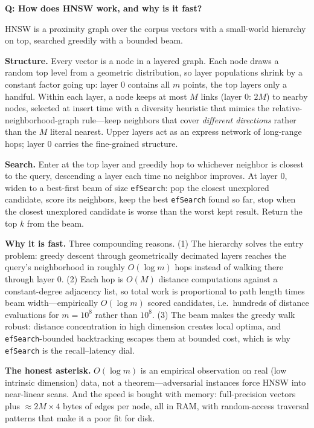 \begin{interviewq}
\textbf{Q: How does HNSW work, and why is it fast?}

 \quad {} \quad \badgefreq{\freqhigh}

\stronganswer

HNSW is a proximity graph over the corpus vectors with a small-world hierarchy on top, searched greedily with a bounded beam.

\textbf{Structure.} Every vector is a node in a layered graph. Each node draws a random top level from a geometric distribution, so layer populations shrink by a constant factor going up: layer 0 contains all $m$ points, the top layers only a handful. Within each layer, a node keeps at most $M$ links (layer 0: $2M$) to nearby nodes, selected at insert time with a diversity heuristic that mimics the relative-neighborhood-graph rule---keep neighbors that cover \emph{different directions} rather than the $M$ literal nearest. Upper layers act as an express network of long-range hops; layer 0 carries the fine-grained structure.

\textbf{Search.} Enter at the top layer and greedily hop to whichever neighbor is closest to the query, descending a layer each time no neighbor improves. At layer 0, widen to a best-first beam of size \texttt{efSearch}: pop the closest unexplored candidate, score its neighbors, keep the best \texttt{efSearch} found so far, stop when the closest unexplored candidate is worse than the worst kept result. Return the top $k$ from the beam.

\textbf{Why it is fast.} Three compounding reasons. (1) The hierarchy solves the entry problem: greedy descent through geometrically decimated layers reaches the query's neighborhood in roughly $O(\log m)$ hops instead of walking there through layer 0. (2) Each hop is $O(M)$ distance computations against a constant-degree adjacency list, so total work is proportional to path length times beam width---empirically $O(\log m)$ scored candidates, i.e.\ hundreds of distance evaluations for $m = 10^8$ rather than $10^8$. (3) The beam makes the greedy walk robust: distance concentration in high dimension creates local optima, and \texttt{efSearch}-bounded backtracking escapes them at bounded cost, which is why \texttt{efSearch} is the recall--latency dial.

\textbf{The honest asterisk.} $O(\log m)$ is an empirical observation on real (low intrinsic dimension) data, not a theorem---adversarial instances force HNSW into near-linear scans. And the speed is bought with memory: full-precision vectors plus $\approx 2M \times 4$ bytes of edges per node, all in RAM, with random-access traversal patterns that make it a poor fit for disk.


\end{interviewq}
